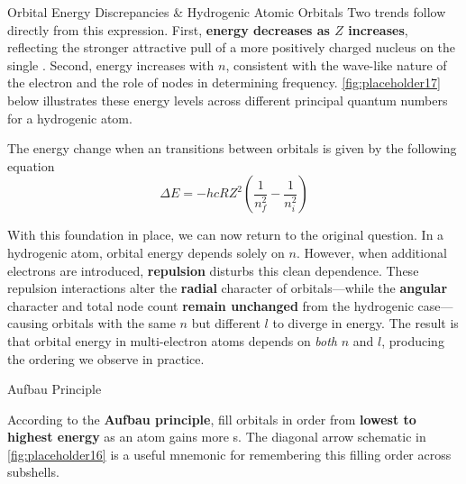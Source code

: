 \documentclass[10pt]{article}
\begin{document}
\begin{core}[label=core:hydrogenic]{Orbital Energy Discrepancies \& Hydrogenic Atomic Orbitals}
      Two trends follow directly from this expression. First, \textbf{energy decreases as $Z$ increases}, reflecting the stronger attractive pull of a more positively charged nucleus on the single . Second, energy increases with $n$, consistent with the wave-like nature of the electron and the role of nodes in determining frequency. \autoref{fig:placeholder17} below illustrates these energy levels across different principal quantum numbers for a hydrogenic atom.


      The energy change when an  transitions between orbitals is given by the following equation
      \[
        \Delta E = -hcRZ^2\left(\frac{1}{n^2_f}-\frac{1}{n^2_i}\right)
      \]

      With this foundation in place, we can now return to the original question. In a hydrogenic atom, orbital energy depends solely on $n$. However, when additional electrons are introduced, \textbf{  repulsion} disturbs this clean dependence. These repulsion interactions alter the \textbf{radial} character of orbitals---while the \textbf{angular} character and total node count \textbf{remain unchanged} from the hydrogenic case---causing orbitals with the same $n$ but different $l$ to diverge in energy. The result is that orbital energy in multi-electron atoms depends on \textit{both} $n$ and $l$, producing the ordering we observe in practice.

    \end{core}

    \begin{core}[label=core:aufbau]{Aufbau Principle}

      According to the \textbf{Aufbau principle},  fill orbitals in order from \textbf{lowest to highest energy} as an atom gains more s. The diagonal arrow schematic in \autoref{fig:placeholder16} is a useful mnemonic for remembering this filling order across subshells.

    \end{core}
\end{document}
